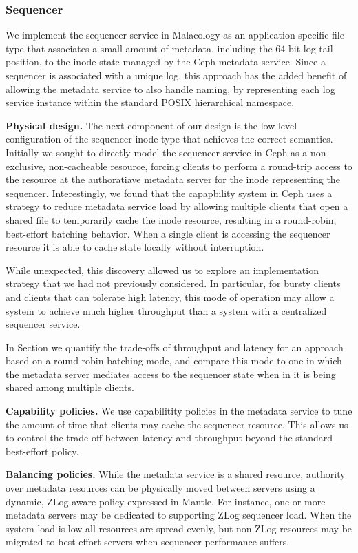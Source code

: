 \documentclass[10pt,twocolumn]{article}
\begin{document}
\subsubsection{Sequencer}

We implement the sequencer service in Malacology as an application-specific
file type that associates a small amount of metadata, including the 64-bit log
tail position, to the inode state managed by the Ceph metadata service.  Since
a sequencer is associated with a unique log, this approach has the added
benefit of allowing the metadata service to also handle naming, by
representing each log service instance within the standard POSIX hierarchical
namespace.

{\bf Physical design.}
The next component of our design is the low-level configuration of the
sequencer inode type that achieves the correct semantics.  Initially we sought
to directly model the sequencer service in Ceph as a non-exclusive,
non-cacheable resource, forcing clients to perform a round-trip access to the
resource at the authoratiave metadata server for the inode representing the
sequencer.  Interestingly, we found that the capapbility system in Ceph uses a
strategy to reduce metadata service load by allowing multiple clients that
open a shared file to temporarily cache the inode resource, resulting in a
round-robin, best-effort batching behavior. When a single client is accessing
the sequencer resource it is able to cache state locally without interruption.

While unexpected, this discovery allowed us to explore an implementation
strategy that we had not previously considered. In particular, for bursty
clients and clients that can tolerate high latency, this mode of operation may
allow a system to achieve much higher throughput than a system with a
centralized sequencer service.

In Section we quantify the trade-offs of throughput and latency for an
approach based on a round-robin batching mode, and compare this mode to one in
which the metadata server mediates access to the sequencer state when in it is
being shared among multiple clients.

{\bf Capability policies.}
We use capabilitity policies in the metadata service to tune the amount of
time that clients may cache the sequencer resource. This allows us to control
the trade-off between latency and throughput beyond the standard best-effort
policy.

{\bf Balancing policies.}
While the metadata service is a shared resource, authority over metadata
resources can be physically moved between servers using a dynamic, ZLog-aware
policy expressed in Mantle. For instance, one or more metadata servers may be
dedicated to supporting ZLog sequencer load. When the system load is low all
resources are spread evenly, but non-ZLog resources may be migrated to
best-effort servers when sequencer performance suffers.
\end{document}
